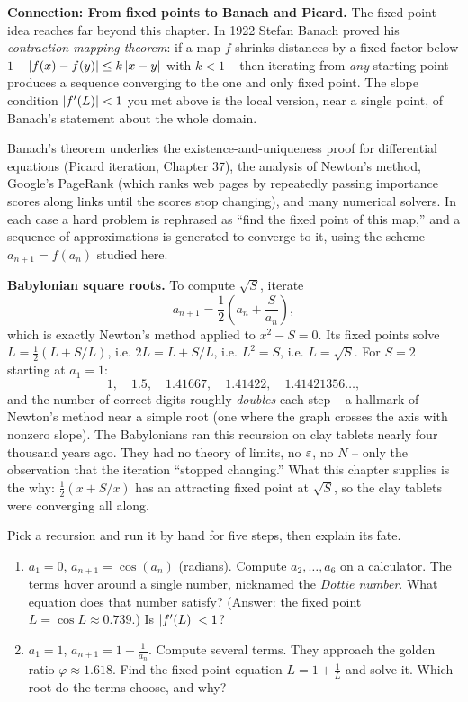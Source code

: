 \begin{connectionbox}
\textbf{Connection: From fixed points to Banach and Picard.}
The fixed-point idea reaches far beyond this chapter.
In 1922 Stefan Banach proved his \emph{contraction mapping theorem}: if a map $f$
shrinks distances by a fixed factor below $1$ -- $\lvert f(x) - f(y)\rvert \le k\,
\lvert x-y\rvert$ with $k < 1$ -- then iterating from \emph{any} starting point produces
a sequence converging to the one and only fixed point. The slope condition
$\lvert f'(L)\rvert < 1$ you met above is the local version, near a single point, of
Banach's statement about the whole domain.

Banach's theorem underlies
the existence-and-uniqueness proof for differential equations (Picard
iteration, Chapter 37), the analysis of Newton's method, Google's PageRank (which
ranks web pages by repeatedly passing importance scores along links until the
scores stop changing), and many numerical solvers. In each case a hard problem is rephrased as
``find the fixed point of this map,'' and a sequence of approximations is
generated to converge to it, using the scheme $a_{n+1} = f(a_n)$ studied here.
\end{connectionbox}

\begin{applicationbox}
\textbf{Babylonian square roots.} To compute $\sqrt{S}$, iterate
\[
  a_{n+1} = \frac12\left(a_n + \frac{S}{a_n}\right),
\]
which is exactly Newton's method applied to $x^2 - S = 0$. Its fixed points solve
$L = \tfrac12(L + S/L)$, i.e. $2L = L + S/L$, i.e. $L^2 = S$, i.e. $L = \sqrt S$.
For $S = 2$ starting at $a_1 = 1$:
\[
  1,\quad 1.5,\quad 1.41667,\quad 1.41422,\quad 1.41421356\ldots,
\]
and the number of correct digits roughly \emph{doubles} each step -- a hallmark of Newton's
method near a simple root (one where the graph crosses the axis with nonzero
slope). The Babylonians ran this recursion on clay tablets
nearly four thousand years ago. They had no theory of limits, no $\varepsilon$, no $N$ --
only the observation that the iteration ``stopped changing.'' What this chapter
supplies is the why: $\tfrac12(x + S/x)$ has an attracting fixed point at
$\sqrt S$, so the clay tablets were converging all along.
\end{applicationbox}

\begin{labbox}
Pick a recursion and run it by hand for five steps, then explain its fate.
\begin{enumerate}
  \item $a_1 = 0$, $a_{n+1} = \cos(a_n)$ (radians). Compute $a_2,\dots,a_6$ on a
        calculator. The terms hover around a single number, nicknamed the
        \emph{Dottie number}. What equation does that number satisfy? (Answer:
        the fixed point $L = \cos L \approx 0.739$.) Is $\lvert f'(L)\rvert < 1$?
  \item $a_1 = 1$, $a_{n+1} = 1 + \tfrac1{a_n}$. Compute several terms. They
        approach the golden ratio $\varphi \approx 1.618$. Find the fixed-point equation $L =
        1 + \tfrac1L$ and solve it. Which root do the terms choose, and why?
\end{enumerate}
\end{labbox}

